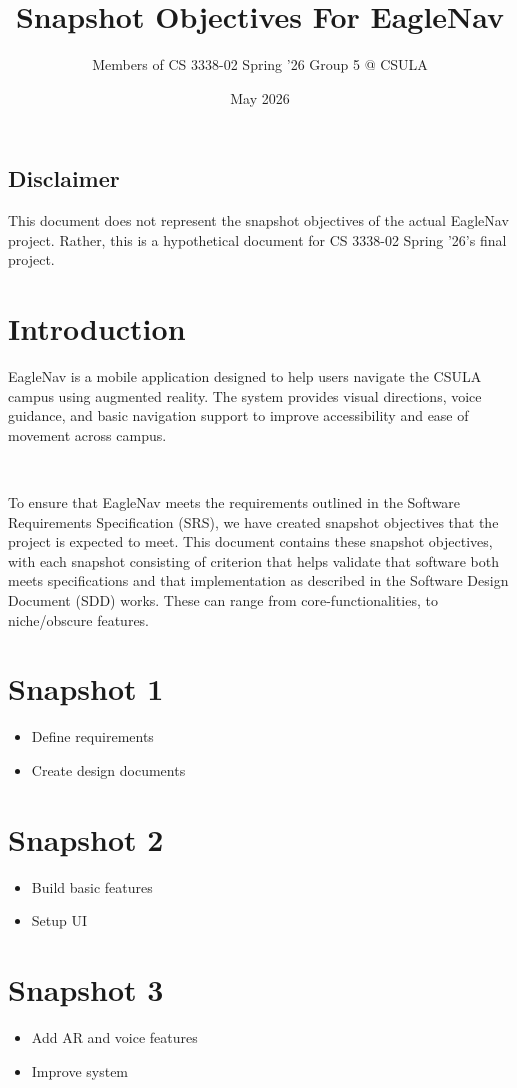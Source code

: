 \documentclass{article}
\title{Snapshot Objectives For EagleNav}
\author{Members of CS 3338-02 Spring '26 Group 5 @ CSULA}
\date{May 2026}
\begin{document}
\maketitle
\subsection{Disclaimer}
This document does not represent the snapshot objectives of the actual EagleNav project. Rather, this is a hypothetical document for CS 3338-02 Spring '26's final project.

\section{Introduction}
EagleNav is a mobile application designed to help users navigate the CSULA campus using augmented reality. The system provides visual directions, voice guidance, and basic navigation support to improve accessibility and ease of movement across campus.

\

To ensure that EagleNav meets the requirements outlined in the Software Requirements Specification (SRS), we have created snapshot objectives that the project is expected to meet. This document contains these snapshot objectives, with each snapshot consisting of criterion that helps validate that software both meets specifications and that implementation as described in the Software Design Document (SDD) works. These can range from core-functionalities, to niche/obscure features.

\section{Snapshot 1}
\begin{itemize}
\item Define requirements
\item Create design documents
\end{itemize}

\section{Snapshot 2}
\begin{itemize}
\item Build basic features
\item Setup UI
\end{itemize}

\section{Snapshot 3}
\begin{itemize}
\item Add AR and voice features
\item Improve system
\end{itemize}
\end{document}
